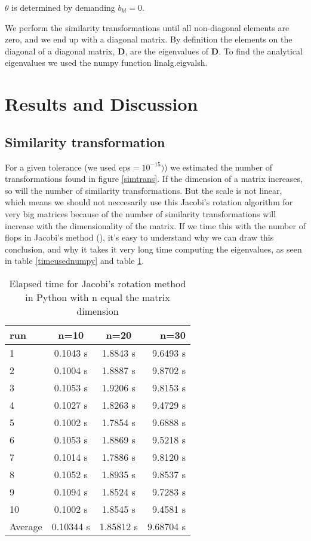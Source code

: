 \documentclass{article}
\begin{document}
$\theta$ is determined by demanding $b_{kl}=0$.

We perform the similarity transformations until all non-diagonal elements are zero, and we end up with a diagonal matrix. By definition the elements on the diagonal of a diagonal matrix, $\mathbf{D}$, are the eigenvalues of $\mathbf{D}$.
\vskip0.5cm
To find the analytical eigenvalues we used the numpy function linalg.eigvalsh.




\section{Results and Discussion}

\subsection{Similarity transformation}


For a given tolerance (we used eps$=10^{-15})$) we estimated the number of transformations found in figure \ref{simtrans}. If the dimension of a matrix increases, so will the number of similarity transformations.
But the scale is not linear, which means we should not neccesarily use this Jacobi's rotation algorithm for very big matrices because of the number of similarity transformations will increase with the dimensionality of the matrix.
If we time this with the number of flops in Jacobi's method (), it's easy to understand why we can draw this conclusion, and why it takes it very long time computing the eigenvalues, as seen in table \ref{timeusednumpy} and table \ref{timeusedjacobi}.


\begin{table}[H]
    \centering
    \begin{tabular}{|l|c|c|r|}
    \hline
     run & n=10 & n=20 & n=30\\
     \hline
      1  & 0.1043 s & 1.8843 s & 9.6493 s\\
      2  & 0.1004 s & 1.8887 s & 9.8702 s\\
      3  & 0.1053 s & 1.9206 s & 9.8153 s\\
      4  & 0.1027 s & 1.8263 s & 9.4729 s\\
      5  & 0.1002 s & 1.7854 s & 9.6888 s\\
      6  & 0.1053 s & 1.8869 s & 9.5218 s\\
      7  & 0.1014 s & 1.7886 s & 9.8120 s\\
      8  & 0.1052 s & 1.8935 s & 9.8537 s\\
      9  & 0.1094 s & 1.8524 s & 9.7283 s\\
      10 & 0.1002 s & 1.8545 s & 9.4581 s\\
      \hline
      Average & 0.10344 s & 1.85812  s & 9.68704 s\\
      \hline
    \end{tabular}
    \caption{Elapsed time for Jacobi's rotation method in Python with n equal the matrix dimension}
    \label{timeusedjacobi}
\end{table}
\end{document}
